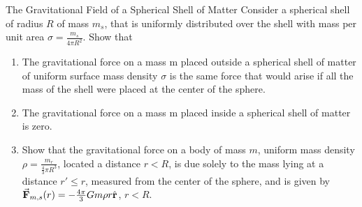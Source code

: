 \documentclass{esg8012pset}
\begin{document}
\begin{problem}{The Gravitational Field of a Spherical Shell of Matter}
  Consider a spherical shell of radius $R$ of mass $m_s$, that is uniformly distributed over the shell with mass per unit area $\sigma = \frac{m_s}{4\pi R^2}$.  Show that
  \begin{enumerate}[1)]
    \item The gravitational force on a mass m placed outside a spherical shell of matter of uniform surface mass density $\sigma$ is the same force that would arise if all the mass of the shell were placed at the center of the sphere.
    \item The gravitational force on a mass m placed inside a spherical shell of matter is zero.
    \item Show that the gravitational force on a body of mass $m$, uniform mass density $\rho = \frac{m_r}{\frac{4}{3}\pi R^3}$, located a distance $r<R$, is due solely to the mass lying at a distance $r'\leq r$, measured from the center of the sphere, and is given by $\vec{\bf{F}}_{m,s}(r)=-\frac{4\pi}{3}Gm\rho r\hat{\bf{r}}$, $r<R$.
  \end{enumerate}
\end{problem}
\end{document}
